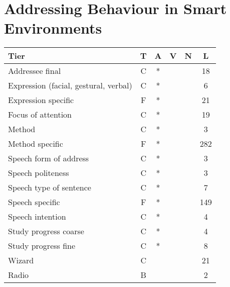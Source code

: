 \chapter{Addressing Behaviour in Smart Environments}

\begin{table}[!ht]
    \centering
    \begin{tabulary}{\textwidth}{ l C C C C C }
        \toprule
        Tier                                  &  T   &    A      &   V     &     N       &      L   \\ \midrule
        Addressee final                       &  C   &    *      &         &             &     18   \\
        Expression (facial, gestural, verbal) &  C   &    *      &         &             &      6   \\
        Expression specific                   &  F   &    *      &         &             &     21   \\
        Focus of attention                    &  C   &    *      &         &             &     19   \\
        Method                                &  C   &    *      &         &             &      3   \\
        Method specific                       &  F   &    *      &         &             &    282   \\
        Speech form of address                &  C   &    *      &         &             &      3   \\
        Speech politeness                     &  C   &    *      &         &             &      3   \\
        Speech type of sentence               &  C   &    *      &         &             &      7   \\
        Speech specific                       &  F   &    *      &         &             &    149   \\
        Speech intention                      &  C   &    *      &         &             &      4   \\
        Study progress coarse                 &  C   &    *      &         &             &      4   \\
        Study progress fine                   &  C   &    *      &         &             &      8   \\
        Wizard                                &  C   &           &         &             &     21   \\
        Radio                                 &  B   &           &         &             &      2   \\

\end{tabulary}
\end{table}
